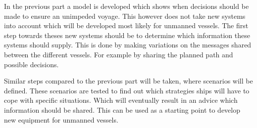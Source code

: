 In the previous part a model is developed which shows when decisions should be made to ensure an unimpeded voyage. This however does not take new systems into account which will be developed most likely for unmanned vessels. The first step towards theses new systems should be to determine which information these systems should supply. This is done by making variations on the messages shared between the different vessels. For example by sharing the planned path and possible decisions.

Similar steps compared to the previous part will be taken, where scenarios will be defined. These scenarios are tested to find out which strategies ships will have to cope with specific situations. Which will eventually result in an advice which information should be shared. This can be used as a starting point to develop new equipment for unmanned vessels.